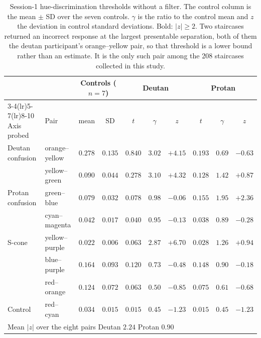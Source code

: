 \begin{table}[h]
\centering
\caption{Session-1 hue-discrimination thresholds without a filter. The control column is the mean $\pm$ SD over the seven controls. $\gamma$ is the ratio to the control mean and $z$ the deviation in control standard deviations. Bold: $|z| \geq 2$. Two staircases returned an incorrect response at the largest presentable separation, both of them the deutan participant's orange--yellow pair, so that threshold is a lower bound rather than an estimate. It is the only such pair among the 208 staircases collected in this study.}
\label{tab:jnd_baseline}
\setlength{\tabcolsep}{4pt}
\begin{tabular}{llcccccccc}
\toprule
& & \multicolumn{2}{c}{Controls ($n = 7$)} & \multicolumn{3}{c}{Deutan} & \multicolumn{3}{c}{Protan} \\
\cmidrule(lr){3-4}\cmidrule(lr){5-7}\cmidrule(lr){8-10}
Axis probed & Pair & mean & SD & $t$ & $\gamma$ & $z$ & $t$ & $\gamma$ & $z$ \\
\midrule
Deutan confusion & orange--yellow & $0.278$ & $0.135$ & $0.840$ & $\mathbf{3.02}$ & $\mathbf{+4.15}$ & $0.193$ & $0.69$ & $-0.63$ \\
                 & yellow--green  & $0.090$ & $0.044$ & $0.278$ & $\mathbf{3.10}$ & $\mathbf{+4.32}$ & $0.128$ & $1.42$ & $+0.87$ \\
\midrule
Protan confusion & green--blue    & $0.079$ & $0.032$ & $0.078$ & $0.98$ & $-0.06$ & $0.155$ & $\mathbf{1.95}$ & $\mathbf{+2.36}$ \\
                 & cyan--magenta  & $0.042$ & $0.017$ & $0.040$ & $0.95$ & $-0.13$ & $0.038$ & $0.89$ & $-0.28$ \\
\midrule
S-cone           & yellow--purple & $0.022$ & $0.006$ & $0.063$ & $\mathbf{2.87}$ & $\mathbf{+6.70}$ & $0.028$ & $1.26$ & $+0.94$ \\
                 & blue--purple   & $0.164$ & $0.093$ & $0.120$ & $0.73$ & $-0.48$ & $0.148$ & $0.90$ & $-0.18$ \\
                 & red--orange    & $0.124$ & $0.072$ & $0.063$ & $0.50$ & $-0.85$ & $0.075$ & $0.61$ & $-0.68$ \\
\midrule
Control          & red--cyan      & $0.034$ & $0.015$ & $0.015$ & $0.45$ & $-1.23$ & $0.015$ & $0.45$ & $-1.23$ \\
\midrule
\multicolumn{7}{l}{Mean $|z|$ over the eight pairs \quad Deutan $2.24$ \quad Protan $0.90$} & & & \\
\bottomrule
\end{tabular}
\end{table}


